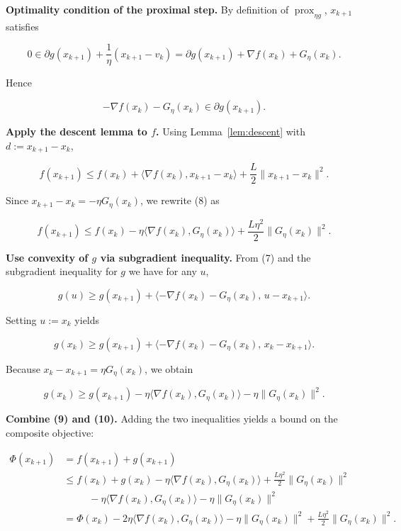 \documentclass{article}
\newcommand{\prox}{\operatorname{prox}}
\newcommand{\grad}{\nabla}
\begin{document}
\begin{enumerate}[label={[\textbf{Step \arabic*}]}, leftmargin=*, nosep]
\item \textbf{Optimality condition of the proximal step.}  
By definition of $\prox_{\eta g}$, $x_{k+1}$ satisfies  

\[
0\in \partial g(x_{k+1})+\frac{1}{\eta}(x_{k+1}-v_{k})
   =\partial g(x_{k+1})+\grad f(x_{k})+G_{\eta}(x_{k}). \tag{6}
\]

Hence  

\[
-\grad f(x_{k})-G_{\eta}(x_{k})\in\partial g(x_{k+1}). \tag{7}
\]

\item \textbf{Apply the descent lemma to $f$.}  
Using Lemma~\ref{lem:descent} with $d:=x_{k+1}-x_{k}$,

\[
f(x_{k+1})\le f(x_{k})+\langle\grad f(x_{k}),x_{k+1}-x_{k}\rangle
               +\frac{L}{2}\|x_{k+1}-x_{k}\|^{2}. \tag{8}
\]

Since $x_{k+1}-x_{k}= -\eta G_{\eta}(x_{k})$, we rewrite (8) as  

\[
f(x_{k+1})\le f(x_{k})-\eta\langle\grad f(x_{k}),G_{\eta}(x_{k})\rangle
               +\frac{L\eta^{2}}{2}\|G_{\eta}(x_{k})\|^{2}. \tag{9}
\]

\item \textbf{Use convexity of $g$ via subgradient inequality.}  
From (7) and the subgradient inequality for $g$ we have for any $u$,

\[
g(u)\ge g(x_{k+1})+\langle -\grad f(x_{k})-G_{\eta}(x_{k}),\,u-x_{k+1}\rangle.
\]

Setting $u:=x_{k}$ yields  

\[
g(x_{k})\ge g(x_{k+1})+\langle -\grad f(x_{k})-G_{\eta}(x_{k}),\,x_{k}-x_{k+1}\rangle.
\]

Because $x_{k}-x_{k+1}= \eta G_{\eta}(x_{k})$, we obtain  

\[
g(x_{k})\ge g(x_{k+1})-\eta\langle\grad f(x_{k}),G_{\eta}(x_{k})\rangle
               -\eta\|G_{\eta}(x_{k})\|^{2}. \tag{10}
\]

\item \textbf{Combine (9) and (10).}  
Adding the two inequalities yields a bound on the composite objective:

\[
\begin{aligned}
\Phi(x_{k+1})&=f(x_{k+1})+g(x_{k+1})\\
&\le f(x_{k})+g(x_{k})
   -\eta\langle\grad f(x_{k}),G_{\eta}(x_{k})\rangle
   +\frac{L\eta^{2}}{2}\|G_{\eta}(x_{k})\|^{2}\\
&\qquad\;\; -\eta\langle\grad f(x_{k}),G_{\eta}(x_{k})\rangle
   -\eta\|G_{\eta}(x_{k})\|^{2}\\[2mm]
&= \Phi(x_{k})
   -2\eta\langle\grad f(x_{k}),G_{\eta}(x_{k})\rangle
   -\eta\|G_{\eta}(x_{k})\|^{2}
   +\frac{L\eta^{2}}{2}\|G_{\eta}(x_{k})\|^{2}. \tag{11}
\end{aligned}
\]


\end{enumerate}
\end{document}
